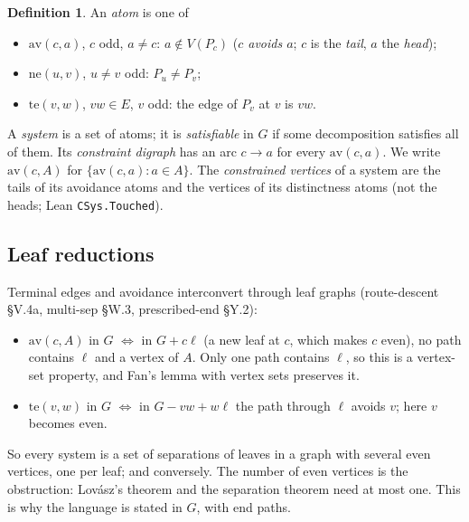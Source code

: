 \documentclass[11pt]{amsart}
\theoremstyle{definition}
\newtheorem{definition}[theorem]{Definition}
\newcommand{\av}{\mathrm{av}}
\newcommand{\nev}{\mathrm{ne}}
\newcommand{\te}{\mathrm{te}}
\begin{document}
\begin{definition}\label{def:atoms}
An \emph{atom} is one of
\begin{itemize}
\item $\av(c,a)$, $c$ odd, $a\ne c$: $a\notin V(P_c)$ (\emph{$c$ avoids $a$}; $c$ is the
\emph{tail}, $a$ the \emph{head});
\item $\nev(u,v)$, $u\ne v$ odd: $P_u\ne P_v$;
\item $\te(v,w)$, $vw\in E$, $v$ odd: the edge of $P_v$ at $v$ is $vw$.
\end{itemize}
A \emph{system} is a set of atoms; it is \emph{satisfiable} in $G$ if some decomposition satisfies
all of them. Its \emph{constraint digraph} has an arc $c\to a$ for every $\av(c,a)$. We write
$\av(c,A)$ for $\{\av(c,a):a\in A\}$. The \emph{constrained vertices} of a system are the tails of its
avoidance atoms and the vertices of its distinctness atoms (not the heads; Lean
\texttt{CSys.Touched}).
\end{definition}

\subsection*{Leaf reductions} Terminal edges and avoidance interconvert through leaf graphs
(route-descent \S V.4a, multi-sep \S W.3, prescribed-end \S Y.2):
\begin{itemize}
\item $\av(c,A)$ in $G$ $\iff$ in $G+c\ell$ (a new leaf at $c$, which makes $c$ even), no path
contains $\ell$ and a vertex of $A$. Only one path contains $\ell$, so this is a vertex-set
property, and Fan's lemma with vertex sets preserves it.
\item $\te(v,w)$ in $G$ $\iff$ in $G-vw+w\ell$ the path through $\ell$ avoids $v$; here $v$ becomes
even.
\end{itemize}
So every system is a set of separations of leaves in a graph with several even vertices, one per
leaf; and conversely. The number of even vertices is the obstruction: Lov\'asz's theorem and the
separation theorem need at most one. This is why the language is stated in $G$, with end paths.
\end{document}
